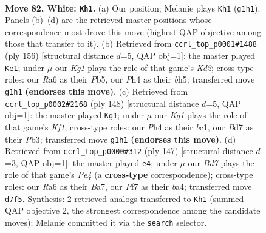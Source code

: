 \documentclass[11pt]{article}
\begin{document}
\clearpage

\begin{figure}[p]\centering
\begin{subfigure}{0.46\textwidth}\centering
\resizebox{\linewidth}{!}{%
\newchessgame
\chessboard[
  setfen={8/3B1P2/R7/8/1k5P/8/8/6K1 w - - 7 82},
  showmover=false,
  pgfstyle=straightmove, color=movearrow, markmove={g1-h1}
]}
\caption{}
\end{subfigure}\hfill
\begin{subfigure}{0.46\textwidth}\centering
\resizebox{\linewidth}{!}{%
\newchessgame
\chessboard[
  setfen={8/8/5p2/1P1k3b/8/8/3K4/6B1 w - - 1 79},
  showmover=false,
  pgfstyle=straightmove, color=movearrow, markmove={d2-e1}
]}
\caption{}
\end{subfigure}
\\[4pt]
\begin{subfigure}{0.46\textwidth}\centering
\resizebox{\linewidth}{!}{%
\newchessgame
\chessboard[
  setfen={8/3B4/8/8/1p5k/1P6/8/2b2K2 w - - 12 75},
  showmover=false,
  pgfstyle=straightmove, color=movearrow, markmove={f1-g1}
]}
\caption{}
\end{subfigure}\hfill
\begin{subfigure}{0.46\textwidth}\centering
\resizebox{\linewidth}{!}{%
\newchessgame
\chessboard[
  setfen={8/b1p5/8/4p3/B7/2K2k2/8/8 b - - 1 74},
  showmover=false,
  pgfstyle=straightmove, color=movearrow, markmove={e5-e4}
]}
\caption{}
\end{subfigure}
\caption{\textbf{Move 82, White: \texttt{Kh1}.} (a) Our position; Melanie plays \texttt{Kh1} (\texttt{g1h1}). Panels (b)--(d) are the retrieved master positions whose correspondence most drove this move (highest QAP objective among those that transfer to it). (b) Retrieved from \texttt{ccrl\_top\_p0001\#1488} (ply 156) [structural distance $d$=5, QAP obj=1]: the master played \texttt{Ke1}; under $\mu$ our \emph{Kg1} plays the role of that game's \emph{Kd2}; cross-type roles: our \emph{R}a6 as their \emph{P}b5, our \emph{P}h4 as their \emph{b}h5; transferred move \texttt{g1h1} \textbf{(endorses this move)}. (c) Retrieved from \texttt{ccrl\_top\_p0002\#2168} (ply 148) [structural distance $d$=5, QAP obj=1]: the master played \texttt{Kg1}; under $\mu$ our \emph{Kg1} plays the role of that game's \emph{Kf1}; cross-type roles: our \emph{P}h4 as their \emph{b}c1, our \emph{B}d7 as their \emph{P}b3; transferred move \texttt{g1h1} \textbf{(endorses this move)}. (d) Retrieved from \texttt{ccrl\_top\_p0000\#312} (ply 147) [structural distance $d$=3, QAP obj=1]: the master played \texttt{e4}; under $\mu$ our \emph{Bd7} plays the role of that game's \emph{Pe4} (a \textbf{cross-type} correspondence); cross-type roles: our \emph{R}a6 as their \emph{B}a7, our \emph{P}f7 as their \emph{b}a4; transferred move \texttt{d7f5}. Synthesis: 2 retrieved analogs transferred to \texttt{Kh1} (summed QAP objective 2, the strongest correspondence among the candidate moves); Melanie committed it via the \texttt{search} selector.}
\label{fig:thought-m162}
\end{figure}
\end{document}
